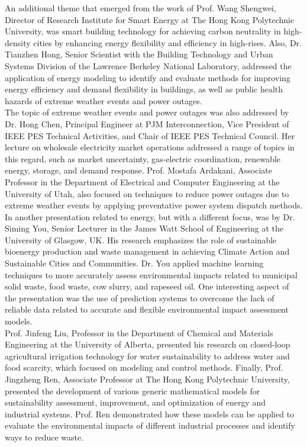 \documentclass[11pt]{article}
\begin{document}
An additional theme that emerged from the work of Prof. Wang Shengwei, Director of Research Institute for Smart Energy at The Hong Kong Polytechnic University, was smart building technology for achieving carbon neutrality in high-density cities by enhancing energy flexibility and efficiency in high-rises. Also, Dr. Tianzhen Hong, Senior Scientist with the Building Technology and Urban Systems Division of the Lawrence Berkeley National Laboratory, addressed the application of energy modeling to identify and evaluate methods for improving energy efficiency and demand flexibility in buildings, as well as public health hazards of extreme weather events and power outages. \\

The topic of extreme weather events and power outages was also addressed by Dr. Hong Chen, Principal Engineer at PJM Interconnection, Vice President of IEEE PES Technical Activities, and Chair of IEEE PES Technical Council. Her lecture on wholesale electricity market operations addressed a range of topics in this regard, such as market uncertainty, gas-electric coordination, renewable energy, storage, and demand response. Prof. Mostafa Ardakani, Associate Professor in the Department of Electrical and Computer Engineering at the University of Utah, also focused on techniques to reduce power outages due to extreme weather events by applying preventative power system dispatch methods.\\

In another presentation related to energy, but with a different focus, was by Dr. Siming You, Senior Lecturer in the James Watt School of Engineering at the University of Glasgow, UK. His research emphasizes the role of sustainable bioenergy production and waste management in achieving Climate Action and Sustainable Cities and Communities. Dr. You applied machine learning techniques to more accurately assess environmental impacts related to municipal solid waste, food waste, cow slurry, and rapeseed oil. One interesting aspect of the presentation was the use of prediction systems to overcome the lack of reliable data related to accurate and flexible environmental impact assessment models.\\

Prof. Jinfeng Liu, Professor in the Department of Chemical and Materials Engineering at the University of Alberta, presented his research on closed-loop agricultural irrigation technology for water sustainability to address water and food scarcity, which focused on modeling and control methods. Finally, Prof. Jingzheng Ren, Associate Professor at The Hong Kong Polytechnic University, presented the development of various generic mathematical models for sustainability assessment, improvement, and optimization of energy and industrial systems. Prof. Ren demonstrated how these models can be applied to evaluate the environmental impacts of different industrial processes and identify ways to reduce waste.\\
\end{document}
